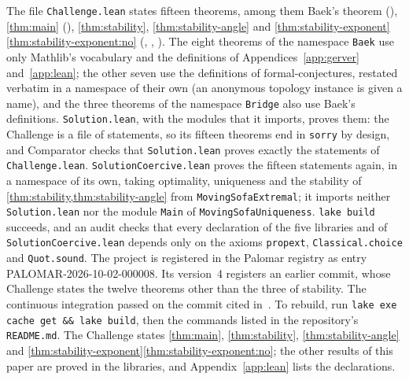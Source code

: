 The file \texttt{Challenge.lean} states fifteen theorems, among them Baek's
theorem (), \cref{thm:main}
(), \cref{thm:stability},
\cref{thm:stability-angle} and
\cref{thm:stability-exponent}\ref{thm:stability-exponent:no}
(, ,
). The eight theorems of the namespace
\texttt{Baek} use only Mathlib's vocabulary and the definitions of
Appendices~\ref{app:gerver} and~\ref{app:lean}; the other seven use the
definitions of formal-conjectures, restated verbatim in a namespace of their own
(an anonymous topology instance is given a name), and the three theorems of the
namespace \texttt{Bridge} also use Baek's definitions. \texttt{Solution.lean},
with the modules that it imports, proves them: the Challenge is a file of
statements, so its fifteen theorems end in \texttt{sorry} by design, and
Comparator checks that \texttt{Solution.lean} proves exactly the statements of
\texttt{Challenge.lean}. \texttt{SolutionCoercive.lean} proves the fifteen
statements again, in a namespace of its own, taking optimality, uniqueness and
the stability of \cref{thm:stability,thm:stability-angle} from
\texttt{MovingSofaExtremal}; it imports neither \texttt{Solution.lean} nor the
module \texttt{Main} of \texttt{MovingSofaUniqueness}. \texttt{lake build}
succeeds, and an audit checks that every declaration of the five libraries and
of \texttt{SolutionCoercive.lean} depends only on the axioms
\texttt{propext}, \texttt{Classical.choice} and \texttt{Quot.sound}. The project
is registered in the Palomar registry as entry PALOMAR-2026-10-02-000008. Its
version~4 registers an earlier commit, whose Challenge states the twelve
theorems other than the three of stability. The continuous integration passed on
the commit cited in~\cite{Companion}. To rebuild, run \texttt{lake exe cache get
\&\& lake build}, then the commands listed in the repository's
\texttt{README.md}. The Challenge states \cref{thm:main}, \cref{thm:stability},
\cref{thm:stability-angle} and
\cref{thm:stability-exponent}\ref{thm:stability-exponent:no}; the other results
of this paper are proved in the libraries, and Appendix~\ref{app:lean} lists the
declarations.

